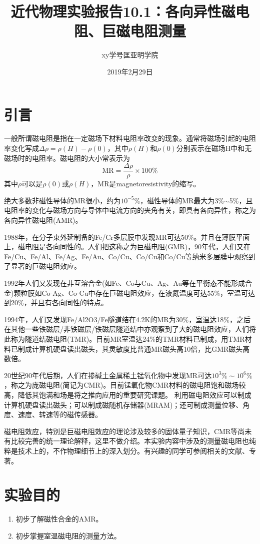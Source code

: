 \documentclass[a4paper]{article}
\title{近代物理实验报告10.1：各向异性磁电阻、巨磁电阻测量}
\author{xy\quad 学号\quad 匡亚明学院}
\date{2019年2月29日}
\begin{document}
\maketitle


\section{引言}
一般所谓磁电阻是指在一定磁场下材料电阻率改变的现象。通常将磁场引起的电阻率变化写成$\Delta\rho = \rho(H) - \rho(0)$，其中$\rho(H)$和$\rho(0)$分别表示在磁场H中和无磁场时的电阻率。磁电阻的大小常表示为
\begin{equation*}
	\text{MR} = \frac{\Delta\rho}{\rho}\times 100\%
\end{equation*}
其中$\rho$可以是$\rho(0)$或$\rho(H)$，MR是magnetoresistivity的缩写。

绝大多数非磁性导体的MR很小，约为$10^{-5}$\%，磁性导体的MR最大为3\%$\sim$5\%，且电阻率的变化与磁场方向与导体中电流方向的夹角有关，即具有各向异性，称之为各向异性磁电阻(AMR)。

1988年，在分子束外延制备的Fe/Cr多层膜中发现MR可达50\%。并且在薄膜平面上，磁电阻是各向同性的。人们把这称之为巨磁电阻(GMR)，90年代，人们又在Fe/Cu、Fe/Al、Fe/Ag、Fe/Au、Co/Cu、Co/Cu和Co/Cu等纳米多层膜中观察到了显著的巨磁电阻效应。

1992年人们又发现在非互溶合金(如Fe、Co与Cu、Ag、Au等在平衡态不能形成合金)颗粒膜如Co-Ag、Co-Cu中存在巨磁电阻效应，在液氮温度可达55\%，室温可达到20\%，并且有各向同性的特点。

1994年，人们又发现Fe/Al2O3/Fe隧道结在4.2K的MR为30\%，室温达18\%，之后在其他一些铁磁层/非铁磁层/铁磁层隧道结中亦观察到了大的磁电阻效应，人们将此称为隧道结磁电阻(TMR)。目前MR室温达24\%的TMR材料已制成，用TMR材料已制成计算机硬盘读出磁头，其灵敏度比普通MR磁头高10倍，比GMR磁头高数倍。

20世纪90年代后期，人们在掺碱土金属稀土锰氧化物中发现MR可达$10^3\%\sim 10^6\%$，称之为庞磁电阻(简记为CMR)。目前锰氧化物CMR材料的磁电阻饱和磁场较高，降低其饱满和场是将之推向应用的重要研究课题。
利用磁电阻效应可以制成计算机硬盘读出磁头；可以制成磁随机存储器(MRAM)；还可制成测量位移、角度、速度、转速等的磁传感器。

磁电阻效应，特别是巨磁电阻效应的理论涉及较多的固体量子知识，CMR等尚未有比较完善的统一理论解释，这里不做介绍。本实验内容中涉及的测量磁电阻也纯粹是技术上的，不作物理细节上的深入划分。有兴趣的同学可参阅相关的文献、专著。

\section{实验目的}
\begin{enumerate}
	\item 初步了解磁性合金的AMR。
	\item 初步掌握室温磁电阻的测量方法。
\end{enumerate}
\end{document}
